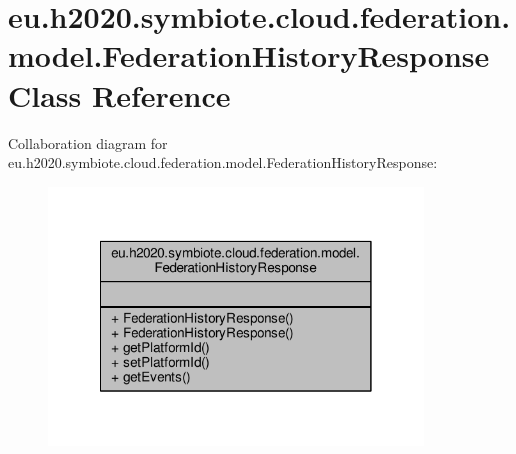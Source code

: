 \hypertarget{classeu_1_1h2020_1_1symbiote_1_1cloud_1_1federation_1_1model_1_1FederationHistoryResponse}{}\section{eu.\+h2020.\+symbiote.\+cloud.\+federation.\+model.\+Federation\+History\+Response Class Reference}
\label{classeu_1_1h2020_1_1symbiote_1_1cloud_1_1federation_1_1model_1_1FederationHistoryResponse}


Collaboration diagram for eu.\+h2020.\+symbiote.\+cloud.\+federation.\+model.\+Federation\+History\+Response\+:\nopagebreak
\begin{figure}[H]
\begin{center}
\leavevmode
\includegraphics[width=282pt]{classeu_1_1h2020_1_1symbiote_1_1cloud_1_1federation_1_1model_1_1FederationHistoryResponse__coll__graph}
\end{center}
\end{figure}

